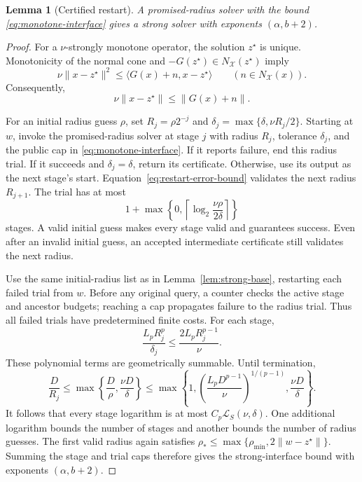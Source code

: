 \documentclass[11pt]{article}
\numberwithin{equation}{section}
\newtheorem{lemma}[theorem]{Lemma}
\theoremstyle{definition}
\theoremstyle{remark}
\begin{document}
\begin{lemma}[Certified restart]\label{lem:certified-restart}
A promised-radius solver with the bound \eqref{eq:monotone-interface} gives a strong
solver with exponents \((\alpha,b+2)\).
\end{lemma}

\begin{proof}
For a \(\nu\)-strongly monotone operator, the solution \(z^\star\) is
unique. Monotonicity of the normal cone and
\(-G(z^\star)\in N_{\mathcal X}(z^\star)\) imply
\[
\nu\|x-z^\star\|^2
\le\langle G(x)+n,x-z^\star\rangle
\qquad(n\in N_{\mathcal X}(x)).
\]
Consequently,
\begin{equation}\label{eq:restart-error-bound}
\nu\|x-z^\star\|\le\|G(x)+n\|.
\end{equation}

For an initial radius guess \(\rho\), set
\(R_j=\rho2^{-j}\) and
\(\delta_j=\max\{\delta,\nu R_j/2\}\).
Starting at \(w\), invoke the promised-radius solver at stage \(j\)
with radius \(R_j\), tolerance \(\delta_j\), and the public cap in
\eqref{eq:monotone-interface}. If it reports failure, end this radius trial. If it
succeeds and \(\delta_j=\delta\), return its certificate. Otherwise,
use its output as the next stage's start. Equation~\eqref{eq:restart-error-bound}
validates the next radius \(R_{j+1}\). The trial has at most
\[
1+\max\left\{0,
\left\lceil\log_2\frac{\nu\rho}{2\delta}\right\rceil\right\}
\]
stages. A valid initial guess makes every stage valid and guarantees
success. Even after an invalid initial guess, an accepted intermediate
certificate still validates the next radius.

Use the same initial-radius list as in Lemma~\ref{lem:strong-base},
restarting each failed trial from \(w\). Before any original query,
a counter checks the active stage and ancestor budgets; reaching a cap
propagates failure to the radius trial. Thus all failed trials have
predetermined finite costs.
For each stage,
\[
\frac{L_pR_j^p}{\delta_j}
\le\frac{2L_pR_j^{p-1}}{\nu}.
\]
These polynomial terms are geometrically summable. Until termination,
\[
\frac D{R_j}
\le\max\left\{\frac D\rho,\frac{\nu D}{\delta}\right\}
\le\max\left\{1,
\left(\frac{L_pD^{p-1}}{\nu}\right)^{1/(p-1)},
\frac{\nu D}{\delta}\right\}.
\]
It follows that every stage logarithm is at most
\(C_p\mathcal L_S(\nu,\delta)\). One additional logarithm bounds the
number of stages and another bounds the number of radius guesses.
The first valid radius again satisfies
\(\rho_*\le\max\{\rho_{\min},2\|w-z^\star\|\}\).
Summing the stage and trial caps therefore gives the strong-interface
bound with exponents \((\alpha,b+2)\).
\end{proof}
\end{document}

